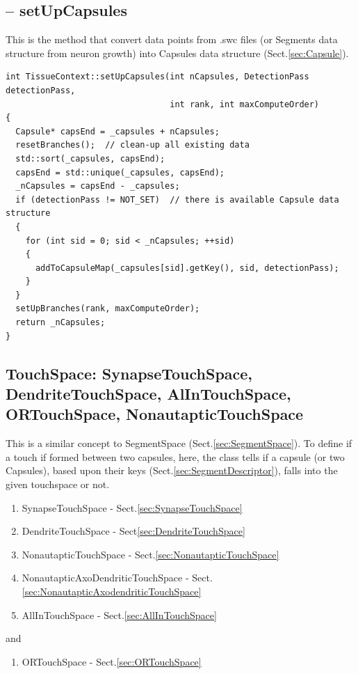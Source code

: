 \subsection{-- setUpCapsules}
\label{sec:TissueContext-setUpCapsules()}

This is the method that convert data points from .swc files
(or Segments data structure from neuron growth) into Capsules data structure
(Sect.\ref{sec:Capsule}).

\begin{verbatim}
int TissueContext::setUpCapsules(int nCapsules, DetectionPass detectionPass,
                                 int rank, int maxComputeOrder)
{
  Capsule* capsEnd = _capsules + nCapsules;
  resetBranches();  // clean-up all existing data
  std::sort(_capsules, capsEnd);
  capsEnd = std::unique(_capsules, capsEnd);
  _nCapsules = capsEnd - _capsules;
  if (detectionPass != NOT_SET)  // there is available Capsule data structure
  {
    for (int sid = 0; sid < _nCapsules; ++sid)
    {
      addToCapsuleMap(_capsules[sid].getKey(), sid, detectionPass);
    }
  }
  setUpBranches(rank, maxComputeOrder);
  return _nCapsules;
}
\end{verbatim}


\subsection{TouchSpace: SynapseTouchSpace, DendriteTouchSpace, AlInTouchSpace,
ORTouchSpace, NonautapticTouchSpace}
\label{sec:TouchSpace}

This is a similar concept to SegmentSpace (Sect.\ref{sec:SegmentSpace}).
To define if a touch if formed between two capsules, here, the class tells if
a capsule (or two Capsules), based upon their keys
(Sect.\ref{sec:SegmentDescriptor}), falls into the given touchspace or not.
\begin{enumerate}
  \item SynapseTouchSpace - Sect.\ref{sec:SynapseTouchSpace}
  \item DendriteTouchSpace - Sect\ref{sec:DendriteTouchSpace}
  \item NonautapticTouchSpace - Sect.\ref{sec:NonautapticTouchSpace}
  \item NonautapticAxoDendriticTouchSpace - Sect.\ref{sec:NonautapticAxodendriticTouchSpace}
  \item AllInTouchSpace - Sect.\ref{sec:AllInTouchSpace}
\end{enumerate}
and
\begin{enumerate}
  \item ORTouchSpace  - Sect.\ref{sec:ORTouchSpace}
\end{enumerate}

